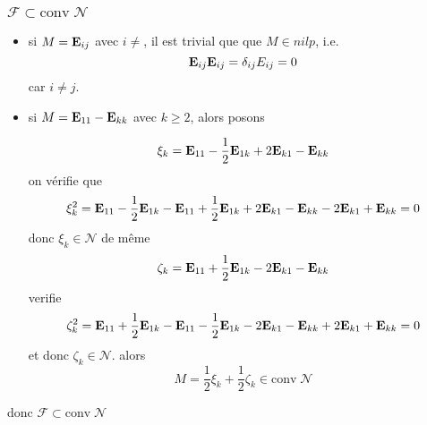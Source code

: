 \documentclass[10pt]{article}
\newcommand{\conv}{\mathrm{conv} \;}
\newcommand{\nilp}{\mathcal{N}}
\newcommand{\Eij}[1]{{\bf E}_{#1}}
\begin{document}
\subsubsection{$\mathcal{F} \subset  \conv \nilp$}

 \begin{itemize}
     \item si $M = \Eij{ij}$ avec $i \neq $, il est trivial que que $M \in nilp$, i.e.
$$
\Eij{ij}\Eij{ij} = \delta_{ij} E_{ij} = 0 
$$
car $i \neq j$. 
  \item si $M = \Eij{11} - \Eij{kk} $ avec $ k \geqslant 2$, alors posons

$$
\xi_k = \Eij{11} - \frac{1}{2} \Eij{1k} + 2 \Eij{k1} -\Eij{kk}
$$
on vérifie que
$$
\xi_k^2 = \Eij{11} - \frac{1}{2} \Eij{1k} - \Eij{11} + \frac{1}{2} \Eij{1k} + 2 \Eij{k1} - \Eij{kk} - 2\Eij{k1} + \Eij{kk} = 0
$$
donc $\xi_k \in \nilp$
de même
$$
\zeta_k = \Eij{11} + \frac{1}{2} \Eij{1k} - 2\Eij{k1} -\Eij{kk} 
$$
verifie
$$
\zeta_k^2 = \Eij{11} + \frac{1}{2} \Eij{1k} -\Eij{11} -\frac{1}{2} \Eij{1k} - 2\Eij{k1} - \Eij{kk}  + 2 \Eij{k1} + \Eij{kk} = 0
$$
et donc $\zeta_k \in \nilp $.
alors
$$
M =  \frac{1}{2} \xi_k + \frac{1}{2} \zeta_k \in \conv \nilp
$$
 \end{itemize}

donc $\mathcal{F} \subset \conv \nilp$
\end{document}
